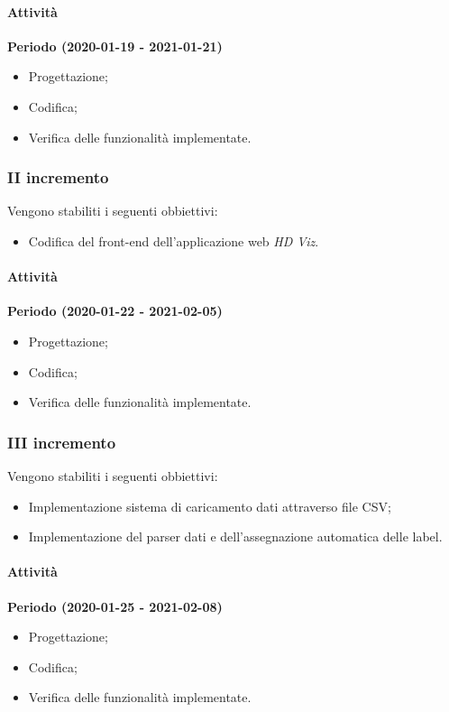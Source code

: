 \documentclass[../piano_di_progetto.tex]{subfiles}
\begin{document}
\paragraph{Attività}
\noindent\textbf{Periodo (2020-01-19 - 2021-01-21)}
\begin{itemize}
    \item Progettazione;
    \item Codifica;
    \item Verifica delle funzionalità implementate.
\end{itemize}

\subsubsection{II incremento}
Vengono stabiliti i seguenti obbiettivi:
\begin{itemize}
    \item Codifica del front-end dell'applicazione web \emph{HD Viz}.
\end{itemize}
\paragraph{Attività}
\noindent\textbf{Periodo (2020-01-22 - 2021-02-05)}
\begin{itemize}
    \item Progettazione;
    \item Codifica;
    \item Verifica delle funzionalità implementate.
\end{itemize}

\subsubsection{III incremento}
Vengono stabiliti i seguenti obbiettivi:
\begin{itemize}
    \item Implementazione sistema di caricamento dati attraverso file CSV;
    \item Implementazione del parser dati e dell'assegnazione automatica delle label.
\end{itemize}
\paragraph{Attività}
\noindent\textbf{Periodo (2020-01-25 - 2021-02-08)}
\begin{itemize}
    \item Progettazione;
    \item Codifica;
    \item Verifica delle funzionalità implementate.
\end{itemize}
\end{document}
